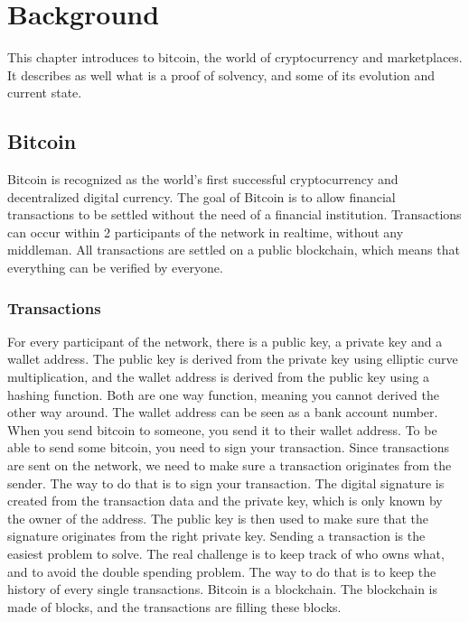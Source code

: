 
\chapter{Background}
This chapter introduces to bitcoin, the world of cryptocurrency and marketplaces. It describes as well 
what is a proof of solvency, and some of its evolution and current state.

\section{Bitcoin}
Bitcoin is recognized as the world's first successful cryptocurrency and decentralized digital currency. 
The goal of Bitcoin is to allow financial transactions to be settled without the need of a financial institution.
Transactions can occur within 2 participants of the network in realtime, without any middleman. 
All transactions are settled on a public blockchain, which means that everything can be verified by everyone. 


\subsection{Transactions}
For every participant of the network, there is a public key,  a private key and a wallet address.
The public key is derived from the private key using elliptic curve multiplication, and the wallet address is derived from the public key using a hashing function.
Both are one way function, meaning you cannot derived the other way around.
The wallet address can be seen as a bank account number. When you send bitcoin to someone, you send it to their wallet address.
To be able to send some bitcoin, you need to sign your transaction. 
Since transactions are sent on the network, we need to make sure a transaction originates from the sender.
The way to do that is to sign your transaction. The digital signature is created from the transaction data and the private key, which is only known by the owner of the address.
The public key is then used to make sure that the signature originates from the right private key.
Sending a transaction is the easiest problem to solve. The real challenge is to keep track of who owns what, and to avoid the double spending problem.
The way to do that is to keep the history of every single transactions. 
Bitcoin is a blockchain. The blockchain is made of blocks, and the transactions are filling these blocks.



